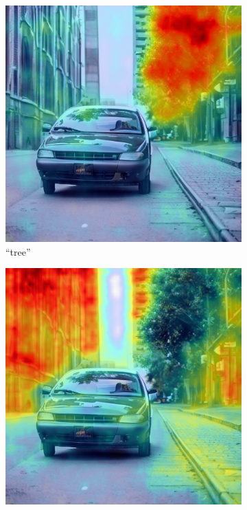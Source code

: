 \begin{figure}
\centering
  \begin{subfigure}{0.30\columnwidth}
   \includegraphics[width=\columnwidth]{img/3-methodology/example_ov_daam_heatmap_tree_without_context.png}
   \caption{``tree''}
   \label{fig:daam-ov-example-image-3}
  \end{subfigure}
  \begin{subfigure}{0.30\columnwidth}
   \includegraphics[width=\columnwidth]{img/3-methodology/example_ov_daam_heatmap_building_without_context.png}

\end{subfigure}
\end{figure}
